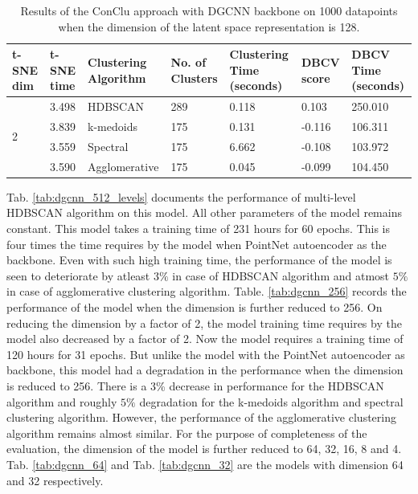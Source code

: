 \begin{table}[H]
  \setlength\extrarowheight{10pt}
  \caption{Results of the ConClu approach with \ac{DGCNN} backbone on 1000 datapoints when the dimension of the latent space representation is 128. }
  \centering
  \begin{tabular}{|p{30pt}|p{50pt}|p{60pt}|p{50pt}|p{50pt}|p{50pt}|p{40pt}|}
    \toprule
    \ac{t-SNE} dim	& \ac{t-SNE} time & Clustering Algorithm & No. of Clusters & Clustering Time (seconds) & \ac{DBCV} score & \ac{DBCV} Time (seconds)\\
    \midrule
    \multirow{4}{30pt}{2}	& 3.498	& \ac{HDBSCAN}	& 289	& 0.118	& 0.103	& 250.010 \\ \cline{2-7} 
    & 3.839	& k-medoids	& 175	& 0.131	& -0.116	& 106.311 \\ \cline{2-7} 
    & 3.559	& Spectral	& 175	& 6.662	& -0.108	& 103.972 \\ \cline{2-7}
    & 3.590	& Agglomerative	& 175	& 0.045	& -0.099	& 104.450 \\ 
    \bottomrule
  \end{tabular}
  \label{tab:dgcnn_128}
\end{table}
Tab. \ref{tab:dgcnn_512_levels} documents the performance of multi-level \ac{HDBSCAN} algorithm on this model. All other parameters of the model remains constant. This model takes a training time of 231 hours for 60 epochs. This is four times the time requires by the model when PointNet autoencoder as the backbone. Even with such high training time, the performance of the model is seen to deteriorate by atleast $3\%$ in case of \ac{HDBSCAN} algorithm and atmost $5\%$ in case of agglomerative clustering algorithm. Table. \ref{tab:dgcnn_256} records the performance of the model when the dimension is further reduced to 256. On reducing the dimension by a factor of 2, the model training time requires by the model also decreased by a factor of 2. Now the model requires a training time of 120 hours for 31 epochs. But unlike the model with the PointNet autoencoder as backbone, this model had a degradation in the performance when the dimension is reduced to 256. There is a 3\% decrease in performance for the \ac{HDBSCAN} algorithm and roughly $5\%$ degradation for the k-medoids algorithm and spectral clustering algorithm. However, the performance of the agglomerative clustering algorithm remains almost similar. For the purpose of completeness of the evaluation, the dimension of the model is further reduced to 64, 32, 16, 8 and 4. Tab. \ref{tab:dgcnn_64} and Tab. \ref{tab:dgcnn_32} are the models with dimension 64 and 32 respectively. 

